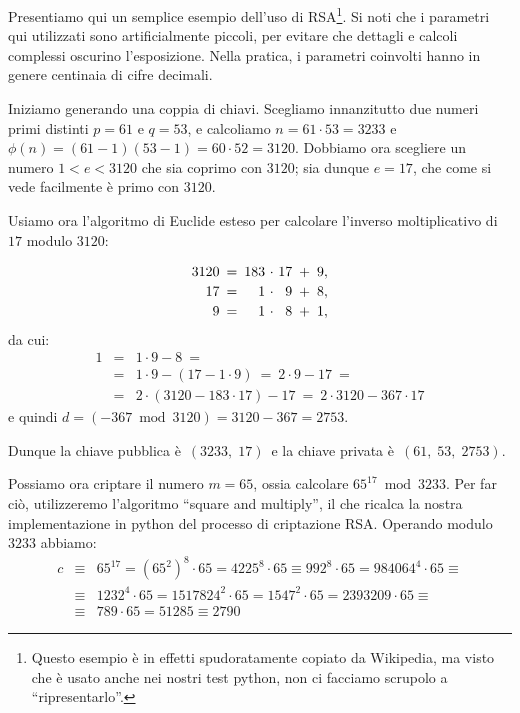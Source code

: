 \documentclass[pdflatex,11pt,a4paper,oneside]{article}
\newcommand{\p}[1]{\left({#1}\right)}
\newcommand{\ephi}[1]{\ensuremath{\phi\p{#1}}}
\newcommand{\congruent}[0]{\equiv}
\newcommand{\mmodop}[0]{\ensuremath{\operatorname{mod}}}
\newcommand{\rem}[2]{\ensuremath{{#1}\:\mmodop\:{#2}}}
\begin{document}
Presentiamo qui un semplice esempio dell'uso di RSA\footnote{Questo
esempio \`e in effetti spudoratamente copiato da Wikipedia, ma visto
che \`e usato anche nei nostri test python, non ci facciamo scrupolo
a ``ripresentarlo''.}. Si noti che i parametri qui utilizzati sono
artificialmente piccoli, per evitare che dettagli e calcoli complessi
oscurino l'esposizione. Nella pratica, i parametri coinvolti hanno
in genere centinaia di cifre decimali.

Iniziamo generando una coppia di chiavi. Scegliamo innanzitutto due numeri
primi distinti $p = 61$ e $q = 53$, e calcoliamo $n = 61 \cdot 53 = 3233$
e $\ephi{n} = (61 - 1)(53 - 1) = 60 \cdot 52 = 3120$. Dobbiamo ora
scegliere un numero $1 < e < 3120$ che sia coprimo con $3120$; sia dunque
$e = 17$, che come si vede facilmente \`e primo con $3120$.

Usiamo ora l'algoritmo di Euclide esteso per calcolare l'inverso
moltiplicativo di $17$ modulo $3120$:

\begin{displaymath}
  \begin{array}{r@{\,~=\,~}r@{~\cdot~}r@{\,~+\,~}r}
  3120 & 183 & 17 & 9, \\[2pt]
    17 &   1 &  9 & 8, \\[2pt]
     9 &   1 &  8 & 1,
  \end{array}
\end{displaymath}
da cui:
\begin{eqnarray*}
    1 & = & 1 \cdot 9 - 8 ~= \\
      & = & 1 \cdot 9 - \p{ 17 - 1 \cdot 9 }
      ~ = ~ 2 \cdot 9 - 17 ~= \\
      & = & 2 \cdot \p{ 3120 - 183 \cdot 17 } - 17
      ~ = ~ 2 \cdot 3120 - 367 \cdot 17
\end{eqnarray*}
e quindi $d = \p{\rem{-367}{3120}} = 3120 - 367 = 2753$.

\medskip\noindent
Dunque la chiave pubblica \`e \,$(3233,\;17)$\, e la chiave privata
\`e \,$(61,\;53,\;2753)$.

\medskip
Possiamo ora criptare il numero $m = 65$, ossia calcolare
$\rem{{65}^{17}}{3233}$. Per far ci\`o, utilizzeremo l'algoritmo ``square
and multiply'', il che ricalca la nostra implementazione in python del
processo di criptazione RSA. Operando modulo $3233$ abbiamo:
\begin{eqnarray*}
c & \congruent\!\! &
    65^{17} = {\p{{65^2}}}^8 \cdot 65 = 4225^8 \cdot 65
    \congruent 992^8 \cdot 65 = 984064^4 \cdot 65 \congruent
  \\
  & \congruent\!\! &
    1232^4 \cdot 65 = 1517824^2 \cdot 65 = 1547^2 \cdot 65
    = 2393209 \cdot 65 \congruent
  \\
  & \congruent\!\! &
    789 \cdot 65 = 51285 \congruent 2790
\end{eqnarray*}
\end{document}
